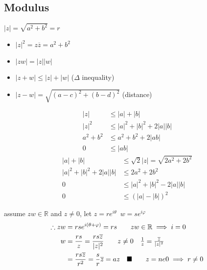 	\subsection{Modulus}
		\begin{definition}
			$|z|=\sqrt{a^2+b^2}=r$
			\begin{itemize}
				\item $|z|^2=z\overline z=a^2+b^2$
				\item $|zw|=|z||w|$
				\item $|z+w|\le|z|+|w|$ ($\Delta$ inequality)
				\item $|z-w|=\sqrt{(a-c)^2+(b-d)^2}$ (distance)
			\end{itemize}
		\end{definition}
		\begin{example}[Prove $|z|\le|a|+|b|\le\sqrt2|z|$ for $z=a+bi\in\mathbb{C}$]
			\begin{align*}
				|z|&\le|a|+|b|\\
				|z|^2&\le |a|^2+|b|^2+2|a||b|\\
				a^2+b^2&\le a^2+b^2+2|ab|\\
				0&\le|ab|
			\end{align*}
			\begin{align*}
				|a|+|b|&\le\sqrt2|z|=\sqrt{2a^2+2b^2}\\
				|a|^2+|b|^2+2|a||b|&\le2a^2+2b^2\\
				0&\le |a|^2+|b|^2-2|a||b|\\
				0&\le(|a|-|b|)^2
			\end{align*}
		\end{example}
		\begin{example}[Prove $zw\in\mathbb{R}\land z\ne0\implies\exists a\in\mathbb{R}$ st $w=a\overline z$]
			assume $zw\in\mathbb{R}$ and $z\ne0$, let $z=re^{i\theta}\enspace w=se^{i\varphi}$
			\begin{align*}
				\therefore zw&=rse^{i(\theta+\varphi)}=rs\tag*{$zw\in\mathbb{R}\implies i=0$}\\
				w&=\frac{rs}z=\frac{rs\overline z}{|z|^2}\tag*{$z\ne0\quad\frac1z=\frac{\overline z}{|z|^2}$}\\
				 &=\frac{rs\overline z}{r^2}=\frac sr\overline z=az\quad\blacksquare\tag*{$z=ne0\implies r\ne0$}\\
			\end{align*}
		\end{example}
